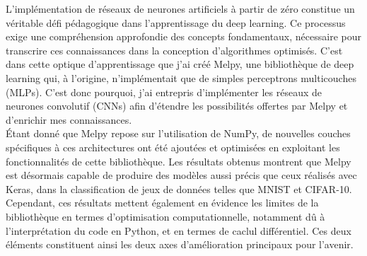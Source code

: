 L’implémentation de réseaux de neurones artificiels à partir de zéro constitue un véritable défi 
pédagogique dans l’apprentissage du deep learning. Ce processus exige une compréhension approfondie 
des concepts fondamentaux, nécessaire pour transcrire ces connaissances dans la conception d’algorithmes 
optimisés. C’est dans cette optique d'apprentissage que j’ai créé Melpy, une bibliothèque 
de deep learning qui, à l’origine, n’implémentait que de simples perceptrons multicouches\cite{MLP} (MLPs). C'est donc pourquoi, 
j’ai entrepris d’implémenter les réseaux de neurones convolutif (CNNs) afin d’étendre les possibilités offertes par 
Melpy et d’enrichir mes connaissances. \\


Étant donné que Melpy repose sur l’utilisation de NumPy, de nouvelles couches spécifiques à ces architectures 
ont été ajoutées et optimisées en exploitant les fonctionnalités de cette bibliothèque. Les résultats obtenus 
montrent que Melpy est désormais capable de produire des modèles aussi précis que ceux réalisés avec Keras, 
dans la classification de jeux de données telles que MNIST\cite{MNIST} et CIFAR-10\cite{CIFAR10}. Cependant, ces résultats 
mettent également en évidence les limites de la bibliothèque en termes d’optimisation computationnelle, notamment dû à l'interprétation
du code en Python, et en termes de caclul différentiel. Ces deux éléments constituent ainsi les deux axes d'amélioration
principaux pour l'avenir.